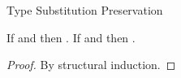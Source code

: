 \begin{lemma}{Type Substitution Preservation}

\label{lemtyp}

If \judeh{\envextt{\first{\tyvarh}}}{\first{\varexph}}{\first{\vartyh}} and \judth{\env}{\second{\vartyh}} then \judeh{\env}{\expsubst{\first{\varexph}}{\second{\vartyh}}{\first{\tyvarh}}}{\tysubst{\first{\vartyh}}{\second{\vartyh}}{\first{\tyvarh}}}.  If \judem{\envextt{\first{\tyvarm}}}{\first{\varexpm}}{\first{\vartym}} and \judtm{\env}{\second{\vartym}} then \judem{\env}{\expsubst{\first{\varexpm}}{\second{\vartym}}{\first{\tyvarm}}}{\tysubst{\first{\vartym}}{\second{\vartym}}{\first{\tyvarm}}}.

\begin{proof}

By structural induction.

\end{proof}

\end{lemma}
